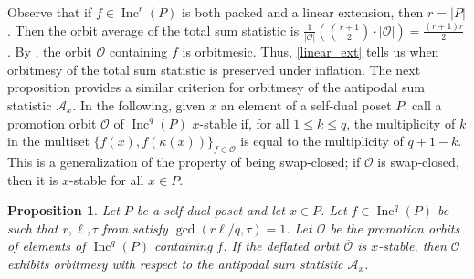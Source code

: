 \documentclass[11pt]{amsart}
\newtheorem{proposition}[theorem]{Proposition}
\theoremstyle{definition}
\DeclareMathOperator{\Inc}{\mathrm{Inc}}
\begin{document}
Observe that if $f\in \Inc^r(P)$ is both packed and a linear extension, then $r=|P|$.
Then the orbit average of the total sum statistic is $\frac{1}{|\mathcal{O}|}\left(\binom{r+1}{2} \cdot |\mathcal{O}|\right) = \frac{(r+1)r}{2}$.
By , the orbit $\mathcal{O}$ containing $f$ is orbitmesic.
Thus, \cref{linear_ext} tells us when orbitmesy of the total sum statistic is preserved under inflation.
The next proposition provides a similar criterion for orbitmesy of the antipodal sum statistic $\mathcal{A}_x$.
In the following, given $x$ an element of a self-dual poset $P$, call  a promotion orbit $\mathcal{O}$ of $\Inc^q(P)$ $x$-stable if, for all $1 \leq k \leq q$, the multiplicity of $k$ in the multiset $\{f(x),f(\kappa(x))
\}_{f \in \mathcal{O}}$ is equal to the multiplicity of $q+1-k$. This is a generalization of the property of being swap-closed; if $\mathcal{O}$ is swap-closed, then it is $x$-stable for all $x \in P$. 

\begin{proposition}\label{prop:Stable}
Let $P$ be a self-dual poset and let $x \in P$. Let $f \in \Inc^q(P)$ be such that $r,\ell,\tau$ from  satisfy $\gcd(r\ell/q,\tau) = 1$. Let $\mathcal{O}$ be the promotion orbits of elements of $\Inc^q(P)$ containing $f$. If the deflated orbit $\overline{\mathcal{O}}$ is $x$-stable, then $\mathcal{O}$ exhibits orbitmesy with respect to the antipodal sum statistic $\mathcal{A}_x$. 
\end{proposition}
\end{document}
